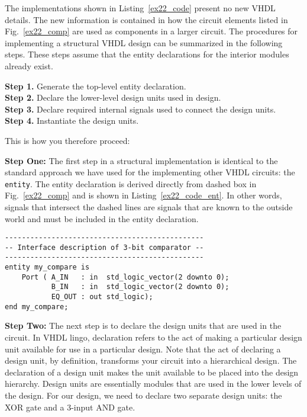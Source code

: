 The implementations shown in Listing~\ref{ex22_code} present no new VHDL details. The new information is contained in how the circuit elements listed in Fig.~\ref{ex22_comp} are used as components in a larger circuit. The procedures for implementing a structural VHDL design can be summarized in the following steps. These steps assume that the entity declarations for the interior modules already exist.

\noindent
\textbf{Step 1.} Generate the top-level entity declaration.\\
\textbf{Step 2.} Declare the lower-level design units used in design.\\
\textbf{Step 3.} Declare required internal signals used to connect the design units.\\
\textbf{Step 4.} Instantiate the design units.

This is how you therefore proceed:

\noindent
\textbf{Step One:} The first step in a structural implementation is identical to the standard approach we have used for the implementing other VHDL circuits: the \texttt{entity}. The entity declaration is derived directly from dashed box in Fig.~\ref{ex22_comp} and is shown in Listing~\ref{ex22_code_ent}. In other words, signals that intersect the dashed lines are signals that are known to the outside world and must be included in the entity declaration.

\noindent
\begin{minipage}{0.99\linewidth}
\begin{lstlisting}[label=ex22_code_ent, caption=Entity declaration for 3-bit comparator.]
-----------------------------------------------
-- Interface description of 3-bit comparator --
-----------------------------------------------
entity my_compare is
    Port ( A_IN   : in  std_logic_vector(2 downto 0);
           B_IN   : in  std_logic_vector(2 downto 0);
           EQ_OUT : out std_logic);
end my_compare;
\end{lstlisting}
\end{minipage}

\noindent
\textbf{Step Two:} The next step is to declare the design units that are used in the circuit. In VHDL lingo, declaration refers to the act of making a particular design unit available for use in a particular design. Note that the act of declaring a design unit, by definition, transforms your circuit into a hierarchical design. The declaration of a design unit makes the unit available to be placed into the design hierarchy. Design units are essentially modules that are used in the lower levels of the design. For our design, we need to declare two separate design units: the XOR gate and a 3-input AND gate.  

